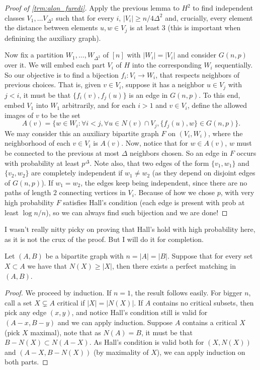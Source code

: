 \begin{proof}[Proof of \ref{trm:alon_furedi}]
	Apply the previous lemma to $H^2$ to find independent classes $V_1,
	\dots V_{\Delta^2}$
	such that for every $i$, $|V_i| \geq n/4\Delta^2$ and, crucially,
	every element the distance between
	elements $u,w \in V_j$ is at least $3$ (this is important when
	definining the auxiliary graph).

	Now fix a partition $W_1, \dots, W_{\Delta^2}$ of $[n]$ with $|W_i|
	= |V_i|$ and consider $G(n,p)$ over it.
	We will embed each part $V_i$ of $H$ into the corresponding $W_i$
	sequentially. So our objective is to find a bijection $f_i : V_i \to W_i$,
	that respects neighbors of previous choices. That is, given $v \in
	V_i$, suppose it has a neighbor $u \in V_j$ with
	$j < i$, it must be that $\{f_i(v), f_{j}(u)\}$ is an edge in $G(n,
	p)$. To this end, embed $V_1$ into $W_1$ arbitrarily,
	and for each $i > 1$ and $v \in V_i$, define the allowed images of
	$v$ to be the set
	\[
		A(v) = \{w \in W_i : \forall i < j, \forall u \in N(v) \cap V_j,
		\{f_j(u), w\} \in G(n,p)\}.
	\]
	We may consider this an auxiliary bipartite graph $F$ on $(V_i,W_i)$,
	where the neighborhood of each $v \in V_i$ is $A(v)$. Now, notice
	that for $w \in A(v)$,
	$w$ must be connected to the previous at most $\Delta$ neighbors
	chosen. So an edge
	in $F$ occurs with probability at least $p^\Delta$. Note also, that
	two edges of the form
	$\{v_1,w_1\}$ and $\{v_2,w_2\}$ are completely independent if $w_1 \neq w_2$
	(as they depend on disjoint edges of $G(n,p)$). If $w_1 = w_2$, the
	edges keep being independent,
	since there are no paths of length $2$ connecting vertices in $V_i$.
	Because of how we chose $p$,
	with very high probability $F$ satisfies Hall's condition (each edge
	is present with prob at least $\log n/ n$), so we can always find
	such bijection
	and we are done!
\end{proof}

I wasn't really nitty picky on proving that Hall's hold with high
probability here, as it is not
the crux of the proof. But I will do it for completion.

\begin{lemma}
	Let $(A,B)$ be a bipartite graph with $n = |A| = |B|$. Suppose that
	for every set $X \subset A$
	we have that $N(X) \geq |X|$, then there exists a perfect matching in $(A,B)$.
\end{lemma}

\begin{proof}
	We proceed by induction. If $n = 1$, the result follows easily. For bigger $n$,
	call a set $X \subsetneq A$ critical if $|X| = |N(X)|$. If $A$
	contains no critical subsets,
	then pick any edge $(x,y)$, and notice Hall's condition still is
	valid for $(A - x, B - y)$
	and we can apply induction. Suppose $A$ contains a critical $X$
	(pick $X$ maximal),
	note that as $N(A) = B$,
	it must be that $B - N(X) \subset N(A - X)$. As Hall's condition is
	valid both for $(X, N(X))$
	and $(A - X, B - N(X))$ (by maximality of $X$), we can apply
	induction on both parts.
\end{proof}

